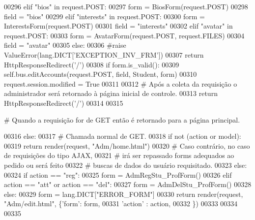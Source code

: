 \begin{DoxyCode}
00296             \textcolor{keywordflow}{elif} \textcolor{stringliteral}{"bios"} \textcolor{keywordflow}{in} request.POST:
00297                 form = BiosForm(request.POST)
00298                 field = \textcolor{stringliteral}{"bios"}
00299             \textcolor{keywordflow}{elif} \textcolor{stringliteral}{"interests"} \textcolor{keywordflow}{in} request.POST:
00300                 form = InterestsForm(request.POST)
00301                 field = \textcolor{stringliteral}{"interests"}
00302             \textcolor{keywordflow}{elif} \textcolor{stringliteral}{"avatar"} \textcolor{keywordflow}{in} request.POST:
00303                 form = AvatarForm(request.POST, request.FILES)
00304                 field = \textcolor{stringliteral}{"avatar"}
00305             \textcolor{keywordflow}{else}:
00306                 \textcolor{comment}{#raise ValueError(lang.DICT['EXCEPTION\_INV\_FRM'])
}
00307                 \textcolor{keywordflow}{return} HttpResponseRedirect(\textcolor{stringliteral}{'/'})
00308             \textcolor{keywordflow}{if} form.is\_valid():
00309                 self.bus.editAccounts(request.POST, field, Student, form)
00310                 request.session.modified = \textcolor{keyword}{True}                
00311 
00312             \textcolor{comment}{# Após a coleta da requisição o administrador será retornado à página inicial de controle.
}
00313             \textcolor{keywordflow}{return} HttpResponseRedirect(\textcolor{stringliteral}{'/'})
00314 
00315         \textcolor{comment}{# Quando a requisição for de GET então é retornado para a página principal.                        
                         
}
00316         \textcolor{keywordflow}{else}:
00317             \textcolor{comment}{# Chamada normal de GET.
}
00318             \textcolor{keywordflow}{if} \textcolor{keywordflow}{not} (action \textcolor{keywordflow}{or} model):
00319                 \textcolor{keywordflow}{return} render(request, \textcolor{stringliteral}{"Adm/home.html"})
00320             \textcolor{comment}{# Caso contrário, no caso de requisições do tipo AJAX, 
}
00321             \textcolor{comment}{#   irá ser repassado forms adequados ao pedido ou será feito
}
00322             \textcolor{comment}{#   buscas de dados do usuário requisitado.
}
00323             \textcolor{keywordflow}{else}:
00324                 \textcolor{keywordflow}{if} action == \textcolor{stringliteral}{"reg"}:
00325                     form = AdmRegStu\_ProfForm()
00326                 \textcolor{keywordflow}{elif} action == \textcolor{stringliteral}{"att"} \textcolor{keywordflow}{or} action == \textcolor{stringliteral}{"del"}:
00327                     form = AdmDelStu\_ProfForm()
00328                 \textcolor{keywordflow}{else}:
00329                     form = lang.DICT[\textcolor{stringliteral}{"ERROR\_FORM"}]
00330                 \textcolor{keywordflow}{return} render(request, \textcolor{stringliteral}{"Adm/edit.html"}, \{\textcolor{stringliteral}{'form'}: form,
00331                                                          \textcolor{stringliteral}{'action'} : action,
00332                                                         \})
00333 
00334 
00335 

\end{DoxyCode}


